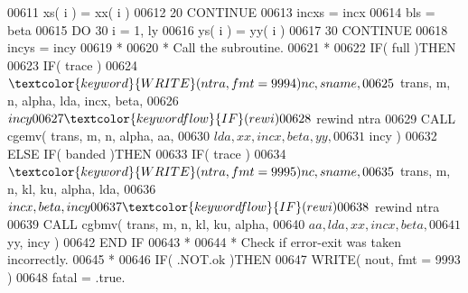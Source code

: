 \begin{DoxyCode}
00611                                  xs( i ) = xx( i )
00612    20                         \textcolor{keywordflow}{CONTINUE}
00613                               incxs = incx
00614                               bls = beta
00615                               \textcolor{keywordflow}{DO} 30 i = 1, ly
00616                                  ys( i ) = yy( i )
00617    30                         \textcolor{keywordflow}{CONTINUE}
00618                               incys = incy
00619 \textcolor{comment}{*}
00620 \textcolor{comment}{*                             Call the subroutine.}
00621 \textcolor{comment}{*}
00622                               \textcolor{keywordflow}{IF}( full )\textcolor{keywordflow}{THEN}
00623                                  \textcolor{keywordflow}{IF}( trace )
00624      $                              \textcolor{keyword}{WRITE}( ntra, fmt = 9994 )nc, sname,
00625      $                              trans, m, n, alpha, lda, incx, beta,
00626      $                              incy
00627                                  \textcolor{keywordflow}{IF}( rewi )
00628      $                              rewind ntra
00629                                  \textcolor{keyword}{CALL }cgemv( trans, m, n, alpha, aa,
00630      $                                       lda, xx, incx, beta, yy,
00631      $                                       incy )
00632                               \textcolor{keywordflow}{ELSE} \textcolor{keywordflow}{IF}( banded )\textcolor{keywordflow}{THEN}
00633                                  \textcolor{keywordflow}{IF}( trace )
00634      $                              \textcolor{keyword}{WRITE}( ntra, fmt = 9995 )nc, sname,
00635      $                              trans, m, n, kl, ku, alpha, lda,
00636      $                              incx, beta, incy
00637                                  \textcolor{keywordflow}{IF}( rewi )
00638      $                              rewind ntra
00639                                  \textcolor{keyword}{CALL }cgbmv( trans, m, n, kl, ku, alpha,
00640      $                                       aa, lda, xx, incx, beta,
00641      $                                       yy, incy )
00642 \textcolor{keywordflow}{                              END IF}
00643 \textcolor{comment}{*}
00644 \textcolor{comment}{*                             Check if error-exit was taken incorrectly.}
00645 \textcolor{comment}{*}
00646                               \textcolor{keywordflow}{IF}( .NOT.ok )\textcolor{keywordflow}{THEN}
00647                                  \textcolor{keyword}{WRITE}( nout, fmt = 9993 )
00648                                  fatal = .true.

\end{DoxyCode}
